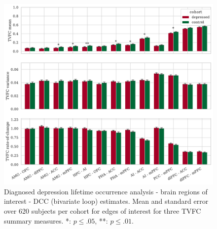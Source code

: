\begin{figure}[h]
    \centering
    \includegraphics[width=\textwidth]{fig/ukbiobank/TVFC_predictions_summaries/diagnosed_lifetime_occurrence/cohort_comparison/ROI/correlation_all_TVFC_summary_measures_DCC_bivariate_loop_edges_of_interest}
    \caption{
        Diagnosed depression lifetime occurrence analysis - brain regions of interest - DCC (bivariate loop) estimates.
        Mean and standard error over 620 subjects per cohort for edges of interest for three TVFC summary measures.
        *: $p \leq .05$, **: $p \leq .01$.
    }\label{fig:ukb-results-dlo-roi-cohort-comparison-edges-of-interest-dcc-bl}
\end{figure}


